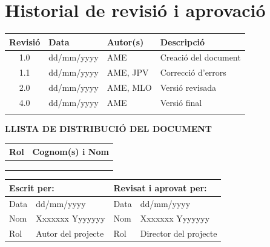 \vspace*{0cm}

\chapter*{Historial de revisió i aprovació}
{}

\begin{tabularx}{\textwidth}{|c|l|l|X|}
  \hline
    \textbf{Revisió} & \textbf{Data} & \textbf{Autor(s)} & \textbf{Descripció} \\
  \hline
    1.0 & dd/mm/yyyy & AME & Creació del document \\
  \hline
    1.1 & dd/mm/yyyy & AME, JPV & Correcció d'errors \\
  \hline
    2.0 & dd/mm/yyyy & AME, MLO & Versió revisada \\
  \hline
    4.0 & dd/mm/yyyy & AME & Versió final \\
  \hline
    & & & \\
  \hline
\end{tabularx}

\vspace{1cm}

\textbf{LLISTA DE DISTRIBUCIÓ DEL DOCUMENT}

\begin{tabularx}{\textwidth}{|l|X|}
  \hline
    \textbf{Rol} & \textbf{Cognom(s) i Nom} \\
  \hline
    [Estudiant] &  \\
  \hline
    [Director del projecte] &  \\
  \hline
    [Director 2 (si aplica)] &  \\
  \hline
\end{tabularx}

\vspace{1cm}

\begin{tabularx}{\textwidth}{|l|X||l|X|}
  \hline
    \multicolumn{2}{|l||}{\textbf{Escrit per:}}  &  \multicolumn{2}{l|}{\textbf{Revisat i aprovat per:}} \\
  \hline
    Data &  dd/mm/yyyy & Data &  dd/mm/yyyy \\
  \hline
    Nom &  Xxxxxxx Yyyyyyy & Nom &  Xxxxxxx Yyyyyyy \\
  \hline
    Rol & Autor del projecte & Rol & Director del projecte \\
  \hline
\end{tabularx}
